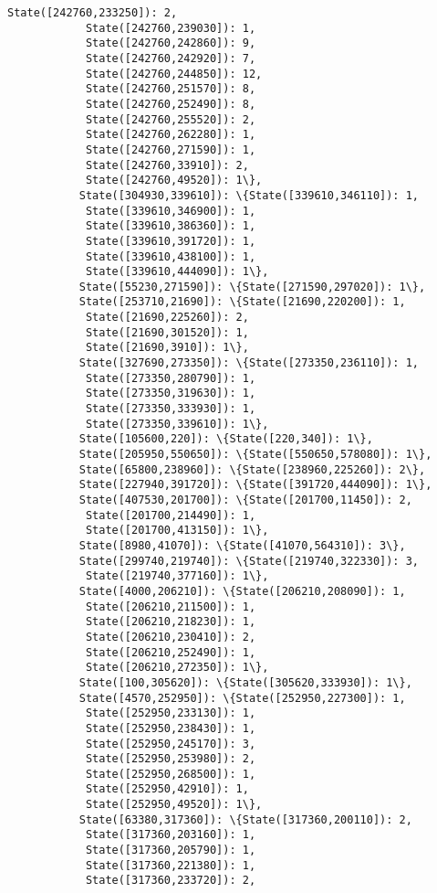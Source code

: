 \documentclass[11pt]{article}
\begin{document}
\begin{Verbatim}[commandchars=\\\{\}]
            State([242760,233250]): 2,
            State([242760,239030]): 1,
            State([242760,242860]): 9,
            State([242760,242920]): 7,
            State([242760,244850]): 12,
            State([242760,251570]): 8,
            State([242760,252490]): 8,
            State([242760,255520]): 2,
            State([242760,262280]): 1,
            State([242760,271590]): 1,
            State([242760,33910]): 2,
            State([242760,49520]): 1\},
           State([304930,339610]): \{State([339610,346110]): 1,
            State([339610,346900]): 1,
            State([339610,386360]): 1,
            State([339610,391720]): 1,
            State([339610,438100]): 1,
            State([339610,444090]): 1\},
           State([55230,271590]): \{State([271590,297020]): 1\},
           State([253710,21690]): \{State([21690,220200]): 1,
            State([21690,225260]): 2,
            State([21690,301520]): 1,
            State([21690,3910]): 1\},
           State([327690,273350]): \{State([273350,236110]): 1,
            State([273350,280790]): 1,
            State([273350,319630]): 1,
            State([273350,333930]): 1,
            State([273350,339610]): 1\},
           State([105600,220]): \{State([220,340]): 1\},
           State([205950,550650]): \{State([550650,578080]): 1\},
           State([65800,238960]): \{State([238960,225260]): 2\},
           State([227940,391720]): \{State([391720,444090]): 1\},
           State([407530,201700]): \{State([201700,11450]): 2,
            State([201700,214490]): 1,
            State([201700,413150]): 1\},
           State([8980,41070]): \{State([41070,564310]): 3\},
           State([299740,219740]): \{State([219740,322330]): 3,
            State([219740,377160]): 1\},
           State([4000,206210]): \{State([206210,208090]): 1,
            State([206210,211500]): 1,
            State([206210,218230]): 1,
            State([206210,230410]): 2,
            State([206210,252490]): 1,
            State([206210,272350]): 1\},
           State([100,305620]): \{State([305620,333930]): 1\},
           State([4570,252950]): \{State([252950,227300]): 1,
            State([252950,233130]): 1,
            State([252950,238430]): 1,
            State([252950,245170]): 3,
            State([252950,253980]): 2,
            State([252950,268500]): 1,
            State([252950,42910]): 1,
            State([252950,49520]): 1\},
           State([63380,317360]): \{State([317360,200110]): 2,
            State([317360,203160]): 1,
            State([317360,205790]): 1,
            State([317360,221380]): 1,
            State([317360,233720]): 2,

\end{Verbatim}
\end{document}
